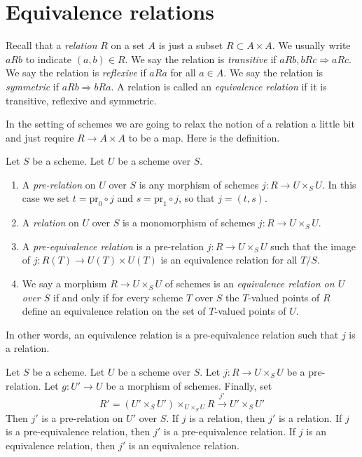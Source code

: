 \section{Equivalence relations}
\label{section-equivalence-relations}

\noindent
Recall that a {\it relation} $R$ on a set $A$ is just a subset
$R \subset A \times A$. We usually write $a R b$ to indicate
$(a, b) \in R$. We say the relation is {\it transitive} if
$a R b, b R c \Rightarrow a R c$. We say the relation is
{\it reflexive} if $a R a$ for all $a \in A$. We say the relation is
{\it symmetric} if $a R b \Rightarrow b R a$.
A relation is called an {\it equivalence relation} if
it is transitive, reflexive and symmetric.

\medskip\noindent
In the setting of schemes we are going to relax the notion of a
relation a little bit and just require $R \to A \times A$ to
be a map. Here is the definition.

\begin{definition}
\label{definition-equivalence-relation}
Let $S$ be a scheme. Let $U$ be a scheme over $S$.
\begin{enumerate}
\item A {\it pre-relation} on $U$ over $S$ is any morphism
of schemes $j : R \to U \times_S U$. In this case we set
$t = \text{pr}_0 \circ j$ and $s = \text{pr}_1 \circ j$, so
that $j = (t, s)$.
\item A {\it relation} on $U$ over $S$ is a monomorphism
of schemes $j : R \to U \times_S U$.
\item A {\it pre-equivalence relation} is a pre-relation
$j : R \to U \times_S U$ such that the image of
$j : R(T) \to U(T) \times U(T)$ is an equivalence relation for
all $T/S$.
\item We say a morphism $R \to U \times_S U$ of schemes is
an {\it equivalence relation on $U$ over $S$}
if and only if for every scheme $T$ over $S$ the $T$-valued
points of $R$ define an equivalence relation
on the set of $T$-valued points of $U$.
\end{enumerate}
\end{definition}

\noindent
In other words, an equivalence relation is a pre-equivalence relation
such that $j$ is a relation.

\begin{lemma}
\label{lemma-restrict-relation}
Let $S$ be a scheme.
Let $U$ be a scheme over $S$.
Let $j : R \to U \times_S U$ be a pre-relation.
Let $g : U' \to U$ be a morphism of schemes.
Finally, set
$$
R' = (U' \times_S U')\times_{U \times_S U} R
\xrightarrow{j'}
U' \times_S U'
$$
Then $j'$ is a pre-relation on $U'$ over $S$.
If $j$ is a relation, then $j'$ is a relation.
If $j$ is a pre-equivalence relation, then $j'$ is a pre-equivalence relation.
If $j$ is an equivalence relation, then $j'$ is an equivalence relation.
\end{lemma}

